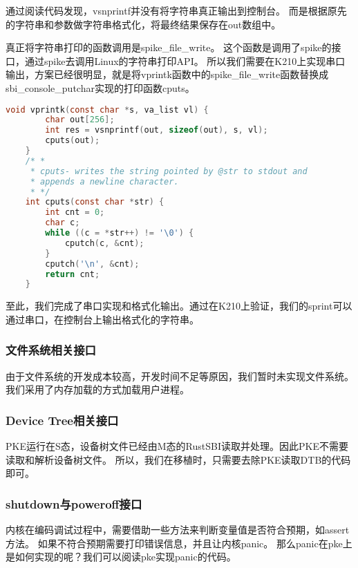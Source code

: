 通过阅读代码发现，vsnprintf并没有将字符串真正输出到控制台。
而是根据原先的字符串和参数做字符串格式化，将最终结果保存在out数组中。

真正将字符串打印的函数调用是spike\_file\_write。
这个函数是调用了spike的接口，通过spike去调用Linux的字符串打印API。
所以我们需要在K210上实现串口输出，方案已经很明显，就是将vprintk函数中的spike\_file\_write函数替换成sbi\_console\_putchar实现的打印函数cputs。

\begin{lstlisting}[language=C, caption={vprintk改造代码}, label={lst:vprintk_dev} ]
    void vprintk(const char *s, va_list vl) {
        char out[256];
        int res = vsnprintf(out, sizeof(out), s, vl);
        cputs(out);
    }
    /* *
     * cputs- writes the string pointed by @str to stdout and
     * appends a newline character.
     * */
    int cputs(const char *str) {
        int cnt = 0;
        char c;
        while ((c = *str++) != '\0') {
            cputch(c, &cnt);
        }
        cputch('\n', &cnt);
        return cnt;
    }   
\end{lstlisting}

至此，我们完成了串口实现和格式化输出。通过在K210上验证，我们的sprint可以通过串口，在控制台上输出格式化的字符串。

\subsubsection{文件系统相关接口}

由于文件系统的开发成本较高，开发时间不足等原因，我们暂时未实现文件系统。
我们采用了内存加载的方式加载用户进程。

\subsubsection{Device Tree相关接口}

PKE运行在S态，设备树文件已经由M态的RustSBI读取并处理。因此PKE不需要读取和解析设备树文件。
所以，我们在移植时，只需要去除PKE读取DTB的代码即可。

\subsubsection{shutdown与poweroff接口}

内核在编码调试过程中，需要借助一些方法来判断变量值是否符合预期，如assert方法。
如果不符合预期需要打印错误信息，并且让内核panic。
那么panic在pke上是如何实现的呢？我们可以阅读pke实现panic的代码。

